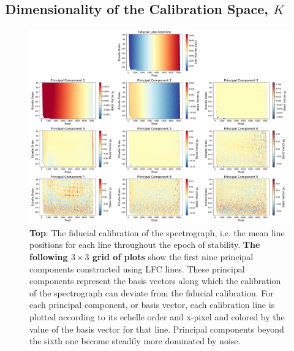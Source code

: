 \documentclass[twocolumn,table,xcolor,trackchanges]{aastex63}
\begin{document}
\subsection{Dimensionality of the Calibration Space, $K$}
\begin{figure}[t]
\centering
\includegraphics[width=\textwidth]{Figures/pcsLfc9.pdf}
\caption{\textbf{Top}:  The fiducial calibration of the spectrograph, i.e. the mean line positions for each line throughout the epoch of stability.  \textbf{The following $3 \times 3$ grid of plots} show the first nine principal components constructed using LFC lines.  These principal components represent the basis vectors along which the calibration of the spectrograph can deviate from the fiducial calibration.  For each principal component, or basis vector, each calibration line is plotted according to its echelle order and x-pixel and colored by the value of the basis vector for that line.  Principal components beyond the sixth one become steadily more dominated by noise.}
\label{fig:pcLfc}
\end{figure}
\end{document}
